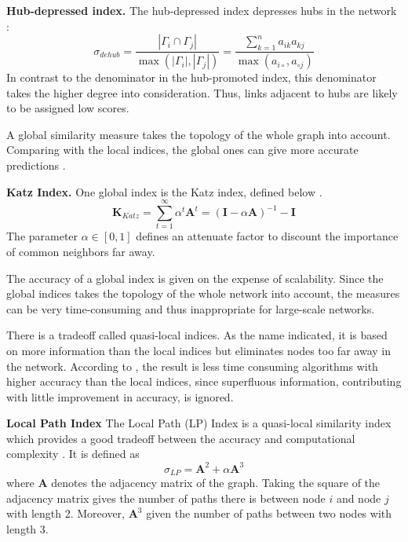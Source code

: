 \textbf{Hub-depressed index.} The hub-depressed index depresses hubs in the network \citep{fouss2016algorithms}:
\begin{equation}
    \label{dehub}
    \sigma_{dehub} = \frac{|\Gamma_i \cap \Gamma_j|}{\max(|\Gamma_i|,|\Gamma_j|)} = \frac{\sum_{k=1}^n a_{ik}a_{kj}}{\max(a_{i \circ },a_{\circ j})}
\end{equation}
In contrast to the denominator in the hub-promoted index, this denominator takes the higher degree into consideration. Thus, links adjacent to hubs are likely to be assigned low scores. 

\begin{comment}
\textbf{Adamic index.} 
\begin{equation}
    \label{adamic}
    \sigma_{Adamic} = \frac{|\Gamma_i \cap \Gamma_j|}{\log(|\Gamma_i|,|\Gamma_j|)} = \frac{\sum_{k=1}^n a_{ik}a_{kj}}{\max(a_{i \circ },a_{\circ j})}
\end{equation}
\end{comment}

A global similarity measure takes the topology of the whole graph into account. Comparing with the local indices, the global ones can give more accurate predictions \citep{lu2011}.

\textbf{Katz Index.} One global index is the Katz index, defined below \citep{fouss2016algorithms}.
\begin{equation}
    \textbf{K}_{Katz}=\sum_{t=1}^{\infty} \alpha^t \textbf{A}^t = (\textbf{I}-\alpha \textbf{A})^{-1}-\textbf{I}
\end{equation}
The parameter $\alpha \in [0,1]$ defines an attenuate factor to discount the importance of common neighbors far away. 

The accuracy of a global index is given on the expense of scalability. Since the global indices takes the topology of the whole network into account, the measures can be very time-consuming and thus inappropriate for large-scale networks. 

There is a tradeoff called quasi-local indices. As the name indicated, it is based on more information than the local indices but eliminates nodes too far away in the network. According to \citet{lu2011}, the result is less time consuming algorithms with higher accuracy than the local indices, since superfluous information, contributing with little improvement in accuracy, is ignored.

\textbf{Local Path Index} The Local Path (LP) Index is a quasi-local similarity index which provides a good tradeoff between the accuracy and computational complexity \citep{lu2011}. It is defined as 
\begin{equation}
    \label{lp}
    \sigma_{LP} = \textbf{A}^2+\alpha \textbf{A}^3
\end{equation}
where $\textbf{A}$ denotes the adjacency matrix of the graph. Taking the square of the adjacency matrix gives the number of paths there is between node $i$ and node $j$ with length 2. Moreover, $\textbf{A}^3$ given the number of paths between two nodes with length 3. 

